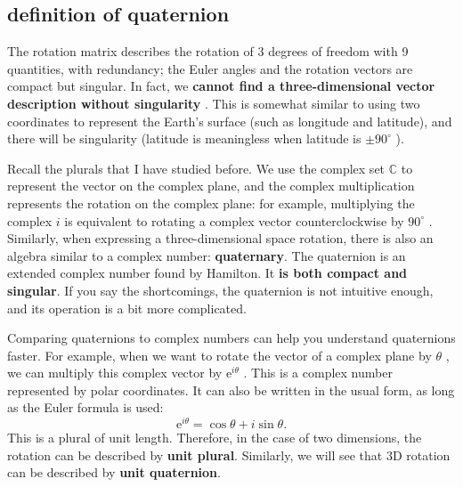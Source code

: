 \subsection{definition of quaternion}

The rotation matrix describes the rotation of 3 degrees of freedom with 9 quantities, with redundancy; the Euler angles and the rotation vectors are compact but singular. In fact, we \textbf{cannot find a three-dimensional vector description without singularity} \textsuperscript{ \cite{Stuelpnagel1964}}. This is somewhat similar to using two coordinates to represent the Earth's surface (such as longitude and latitude), and there will be singularity (latitude is meaningless when latitude is $ \pm  90 ^ \circ $ ).

Recall the plurals that I have studied before. We use the complex set $ \mathbb {C} $ to represent the vector on the complex plane, and the complex multiplication represents the rotation on the complex plane: for example, multiplying the complex $ i $ is equivalent to rotating a complex vector counterclockwise by $ 90 ^ \circ $ . Similarly, when expressing a three-dimensional space rotation, there is also an algebra similar to a complex number: \textbf{quaternary}. The quaternion is an extended complex number found by Hamilton. It \textbf{ is both compact and singular}. If you say the shortcomings, the quaternion is not intuitive enough, and its operation is a bit more complicated.

Comparing quaternions to complex numbers can help you understand quaternions faster. For example, when we want to rotate the vector of a complex plane by $ \theta $ , we can multiply this complex vector by $ \mathrm {e}^{i \theta } $ . This is a complex number represented by polar coordinates. It can also be written in the usual form, as long as the Euler formula is used:
\begin{equation}
\mathrm{e}^{i\theta} = \cos \theta + i \sin \theta.
\end{equation}
This is a plural of unit length. Therefore, in the case of two dimensions, the rotation can be described by \textbf{unit plural}. Similarly, we will see that 3D rotation can be described by \textbf{unit quaternion}.

